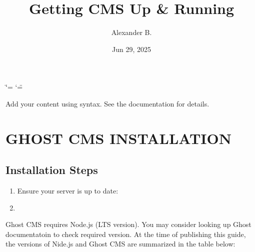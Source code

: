 \documentclass[letterpaper,10pt,english]{sphinxmanual}
\title{Getting CMS Up \& Running}
\date{Jun 29, 2025}
\author{Alexander B.\@{}}
\begin{document}
\ifdefined\shorthandoff
  \ifnum\catcode`\=\string=\active\shorthandoff{=}\fi
  \ifnum\catcode`\"=\active{}\fi
\fi

\pagestyle{empty}
\sphinxmaketitle
\pagestyle{plain}
\sphinxtableofcontents
\pagestyle{normal}
\label{\detokenize{index::doc}}


\sphinxAtStartPar
Add your content using  syntax. See the
documentation for details.

\sphinxstepscope


\chapter{GHOST CMS INSTALLATION}
\label{\detokenize{setup_backend:ghost-cms-installation}}\label{\detokenize{setup_backend::doc}}

\section{Installation Steps}
\label{\detokenize{setup_backend:installation-steps}}\begin{enumerate}
%
\item {} 
\sphinxAtStartPar
{}

\sphinxAtStartPar
Ensure your server is up to date:

\item {} 
\sphinxAtStartPar
{}

\end{enumerate}

\sphinxAtStartPar
Ghost CMS requires Node.js (LTS version). You may consider looking up Ghost documentatoin to check required version. At the time of publishing this guide, the versions of Nide.js and Ghost CMS are summarized in the table below:
\end{document}
